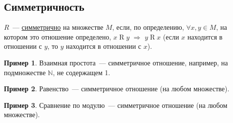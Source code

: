 \documentclass[russian]{lecture-notes}
\theoremstyle{definition}
\newtheorem{example*}{Пример}[subsection]
\newcommand{\R}[2]{$#1\mathrel{R}#2$}
\begin{document}
\subsection{Симметричность}
\label{opr:simmetr}
\begin{definition}
	$R$~--- \underline{симметрично} на множестве $M$, если, по определению, $\forall x, y \in M$, на котором это отношение определено, \R{x}{y} $\Rightarrow$ \R{y}{x} (если $x$ находится в отношении с $y$, то $y$ находится в отношении с $x$).
\end{definition}

\begin{example*}
	Взаимная простота~--- симметричное отношение, например, на подмножестве $\mathbb{N}$, не содержащем 1.
\end{example*}

\begin{example*}
	Равенство~--- симметричное отношение (на любом множестве).
\end{example*}

\begin{example*}
	Сравнение по модулю~--- симметричное отношение (на любом множестве).
\end{example*}
\end{document}
